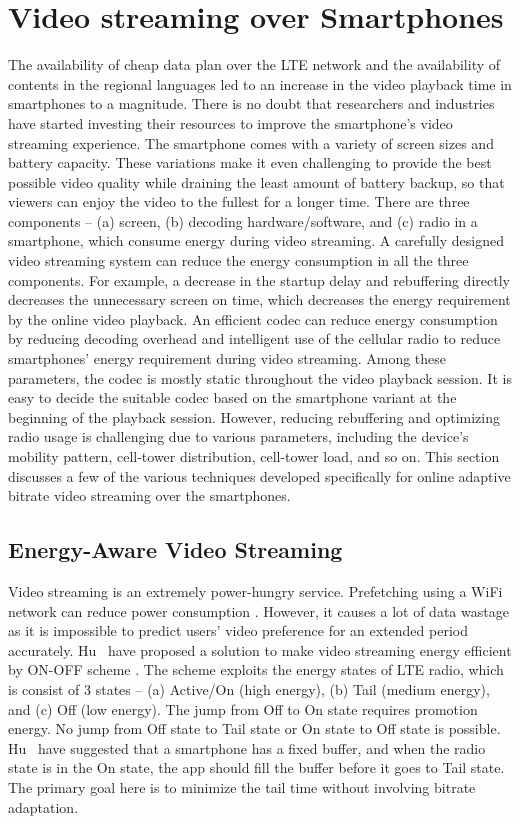 \section{Video streaming over Smartphones}
The availability of cheap data plan over the LTE network and the availability of contents in the regional languages led to an increase in the video playback time in smartphones to a magnitude. There is no doubt that researchers and industries have started investing their resources to improve the smartphone's video streaming experience. The smartphone comes with a variety of screen sizes and battery capacity. These variations make it even challenging to provide the best possible video quality while draining the least amount of battery backup, so that viewers can enjoy the video to the fullest for a longer time. There are three components -- (a) screen, (b) decoding hardware/software, and (c) radio in a smartphone, which consume energy during video streaming. A carefully designed video streaming system can reduce the energy consumption in all the three components. For example, a decrease in the startup delay and rebuffering directly decreases the unnecessary screen on time, which decreases the energy requirement by the online video playback. An efficient codec can reduce energy consumption by reducing decoding overhead and intelligent use of the cellular radio to reduce smartphones' energy requirement during video streaming. Among these parameters, the codec is mostly static throughout the video playback session. It is easy to decide the suitable codec based on the smartphone variant at the beginning of the playback session. However, reducing rebuffering and optimizing radio usage is challenging due to various parameters, including the device's mobility pattern, cell-tower distribution, cell-tower load, and so on. This section discusses a few of the various techniques developed specifically for online adaptive bitrate video streaming over the smartphones.

\subsection{Energy-Aware Video Streaming}
Video streaming is an extremely power-hungry service. Prefetching using a WiFi network can reduce power consumption \cite{6681586,10.1145/2079296.2079321}. However, it causes a lot of data wastage as it is impossible to predict users' video preference for an extended period accurately. Hu \etal\ have proposed a solution to make video streaming energy efficient by ON-OFF scheme \cite{7218493}. The scheme exploits the energy states of LTE radio, which is consist of 3 states -- (a) Active/On (high energy), (b) Tail (medium energy), and (c) Off (low energy). The jump from Off to On state requires promotion energy. No jump from Off state to Tail state or On state to Off state is possible. Hu \etal\ have suggested that a smartphone has a fixed buffer, and when the radio state is in the On state, the app should fill the buffer before it goes to Tail state. The primary goal here is to minimize the tail time without involving bitrate adaptation.

